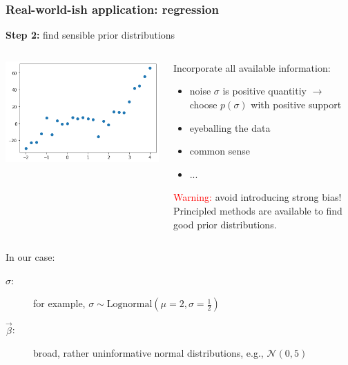\documentclass[t,aspectratio=169]{beamer}
\begin{document}
\begin{frame}
  \frametitle{Real-world-ish application: regression}
  \textbf{Step 2:} find sensible prior distributions
  \begin{columns}
    \begin{column}[T]{0.35\textwidth}
      {\centering
        \includegraphics[width=\textwidth]{images/polyfit_data.png}
      }
    \end{column}
    \begin{column}[T]{0.6\textwidth}
      Incorporate all available information:
      \begin{itemize}
      \item noise $\sigma$ is positive quantitiy $\rightarrow$ choose $p(\sigma)$ with positive support
      \item eyeballing the data
      \item common sense
      \item ...
      \end{itemize}
      \textcolor{red}{Warning:} avoid introducing strong bias!\\
      Principled methods are available to find good prior distributions.
    \end{column}
  \end{columns}
  In our case:\\
  \begin{description}
  \item[$\sigma$:] for example, $\sigma \sim \mathrm{Lognormal}(\mu=2, \sigma=\frac{1}{2})$
  \item[$\vec \beta$:] broad, rather uninformative normal distributions, e.g., $\mathcal{N}(0, 5)$
  \end{description}
\end{frame}
\end{document}
